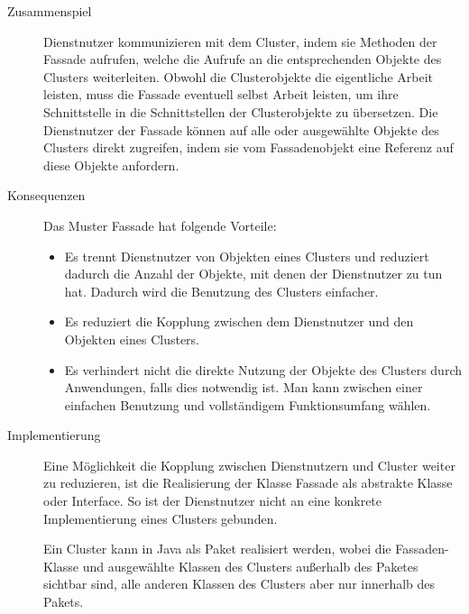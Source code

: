 \begin{description}
	\item[Zusammenspiel] Dienstnutzer kommunizieren mit dem Cluster, indem sie Methoden der Fassade aufrufen, welche die Aufrufe an die entsprechenden Objekte des Clusters weiterleiten. Obwohl die Clusterobjekte die eigentliche Arbeit leisten, muss die Fassade eventuell selbst Arbeit leisten, um ihre Schnittstelle in die Schnittstellen der Clusterobjekte zu übersetzen. Die Dienstnutzer der Fassade können auf alle oder ausgewählte Objekte des Clusters direkt zugreifen, indem sie vom Fassadenobjekt eine Referenz auf diese Objekte anfordern.
	\item[Konsequenzen] Das Muster Fassade hat folgende Vorteile:
	\begin{itemize}
		\item 	Es trennt Dienstnutzer von Objekten eines Clusters und reduziert dadurch die Anzahl der Objekte, mit denen der Dienstnutzer zu tun hat. Dadurch wird die Benutzung des Clusters einfacher.
		\item 	Es reduziert die Kopplung zwischen dem Dienstnutzer und den Objekten eines Clusters.
		\item 	Es verhindert nicht die direkte Nutzung der Objekte des Clusters durch Anwendungen, falls dies notwendig ist. Man kann zwischen einer ein\-fachen Benutzung und vollständigem Funktionsumfang wählen.
	\end{itemize}

	\item[Implementierung] Eine Möglichkeit die Kopplung zwischen Dienstnutzern und \linebreak %
	Cluster weiter zu reduzieren, ist die Realisierung der Klasse Fassade als abstrakte Klasse oder Interface. So ist der Dienstnutzer nicht an eine konkrete Implementierung eines Clusters gebunden.
	
	Ein Cluster kann in Java als Paket realisiert werden, wobei die Fassaden-Klasse und ausgewählte Klassen des Clusters außerhalb des Paketes sichtbar sind, alle anderen Klassen des Clusters aber nur innerhalb des Pakets.	
\end{description}